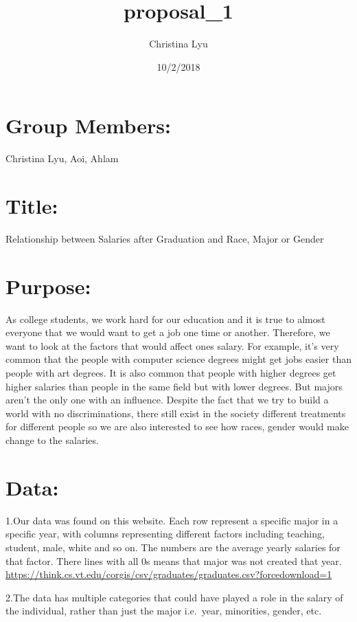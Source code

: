 \documentclass[]{article}
\title{proposal\_1}
\author{Christina Lyu}
\date{10/2/2018}
\begin{document}
\maketitle

\section{Group Members:}\label{group-members}

Christina Lyu, Aoi, Ahlam

\section{Title:}\label{title}

Relationship between Salaries after Graduation and Race, Major or Gender

\section{Purpose:}\label{purpose}

As college students, we work hard for our education and it is true to
almost everyone that we would want to get a job one time or another.
Therefore, we want to look at the factors that would affect ones salary.
For example, it's very common that the people with computer science
degrees might get jobs easier than people with art degrees. It is also
common that people with higher degrees get higher salaries than people
in the same field but with lower degrees. But majors aren't the only one
with an influence. Despite the fact that we try to build a world with no
discriminations, there still exist in the society different treatments
for different people so we are also interested to see how races, gender
would make change to the salaries.

\section{Data:}\label{data}

1.Our data was found on this website. Each row represent a specific
major in a specific year, with columns representing different factors
including teaching, student, male, white and so on. The numbers are the
average yearly salaries for that factor. There lines with all 0s means
that major was not created that year.
\url{https://think.cs.vt.edu/corgis/csv/graduates/graduates.csv?forcedownload=1}

2.The data has multiple categories that could have played a role in the
salary of the individual, rather than just the major i.e.~year,
minorities, gender, etc.
\end{document}
